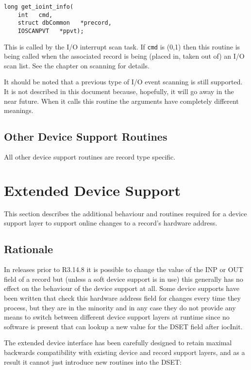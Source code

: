 \begin{verbatim}
long get_ioint_info(
    int   cmd,
    struct dbCommon   *precord,
    IOSCANPVT   *ppvt);
\end{verbatim}

This is called by the I/O interrupt scan task. If \verb|cmd| is (0,1) then this routine is being called when the associated record is 
being (placed in, taken out of) an I/O scan list. See the chapter on scanning for details.

It should be noted that a previous type of I/O event scanning is still supported. It is not described in this document 
because, hopefully, it will go away in the near future. When it calls this routine the arguments have completely different 
meanings.

\subsection{Other Device Support Routines}

All other device support routines are record type specific.

\section{Extended Device Support}

This section describes the additional behaviour and routines required for a device support layer to support online changes 
to a record's hardware address.

\subsection{Rationale}

In releases prior to R3.14.8 it is possible to change the value of the INP or OUT field of a record but (unless a soft device 
support is in use) this generally has no effect on the behaviour of the device support at all. Some device supports have 
been written that check this hardware address field for changes every time they process, but they are in the minority and in 
any case they do not provide any means to switch between different device support layers at runtime since no software is 
present that can lookup a new value for the DSET field after iocInit.

The extended device interface has been carefully designed to retain maximal backwards compatibility with existing 
device and record support layers, and as a result it cannot just introduce new routines into the DSET:

